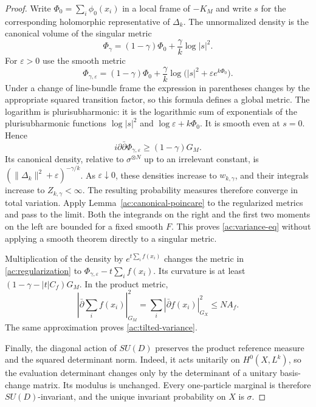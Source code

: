 \begin{proof}
Write $\Phi_0=\sum_i\phi_0(x_i)$ in a local frame of $-K_M$ and
write $s$ for the corresponding holomorphic representative of
$\Delta_k$.  The unnormalized density is the canonical volume of
the singular metric
\[
 \Phi_\gamma=(1-\gamma)\Phi_0+\frac\gamma k\log|s|^2.
\]
For $\varepsilon>0$ use the smooth metric
\begin{equation}
 \Phi_{\gamma,\varepsilon}
  =(1-\gamma)\Phi_0+\frac\gamma k
                 \log\bigl(|s|^2+\varepsilon e^{k\Phi_0}\bigr).
 \label{ac:regularization}
\end{equation}
Under a change of line-bundle frame the expression in parentheses
changes by the appropriate squared transition factor, so this formula
defines a global metric.  The logarithm is plurisubharmonic: it is
the logarithmic sum of exponentials of the plurisubharmonic functions
$\log|s|^2$ and $\log\varepsilon+k\Phi_0$.  It is smooth even at
$s=0$.  Hence
\[
 i\partial\bar\partial\Phi_{\gamma,\varepsilon}
                          \ge(1-\gamma)G_M.
\]
Its canonical density, relative to $\sigma^{\otimes N}$ up to an
irrelevant constant, is
$(\|\Delta_k\|^2+\varepsilon)^{-\gamma/k}$.
As $\varepsilon\downarrow0$, these densities increase to
$w_{k,\gamma}$, and their integrals increase to $Z_{k,\gamma}<\infty$.
The resulting probability measures therefore converge in total
variation.  Apply Lemma~\ref{ac:canonical-poincare} to the regularized
metrics and pass to the limit.  Both the integrands on the right and
the first two moments on the left are bounded for a fixed smooth $F$.
This proves \eqref{ac:variance-eq} without applying a smooth theorem
directly to a singular metric.

Multiplication of the density by $e^{t\sum_i f(x_i)}$ changes the
metric in \eqref{ac:regularization} to
$\Phi_{\gamma,\varepsilon}-t\sum_i f(x_i)$.  Its curvature is at
least $(1-\gamma-|t|C_f)G_M$.  In the product metric,
\[
 \left|\bar\partial\sum_i f(x_i)\right|_{G_M}^2
             =\sum_i|\bar\partial f(x_i)|_{G_X}^2\le NA_f.
\]
The same approximation proves \eqref{ac:tilted-variance}.

Finally, the diagonal action of $SU(D)$ preserves the product reference
measure and the squared determinant norm.  Indeed, it acts unitarily
on $H^0(X,L^k)$, so the evaluation determinant changes only by the
determinant of a unitary basis-change matrix.  Its modulus is unchanged.
Every one-particle marginal is therefore $SU(D)$-invariant, and the
unique invariant probability on $X$ is $\sigma$.
\end{proof}

